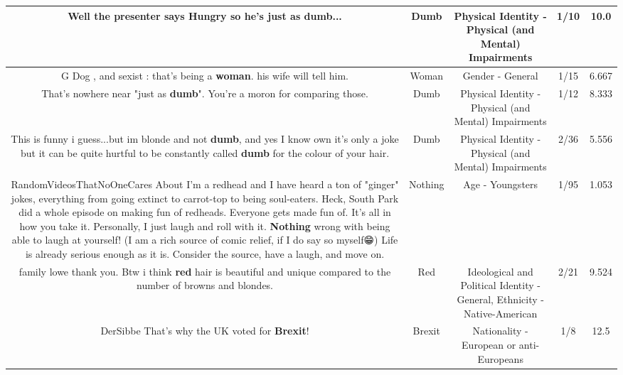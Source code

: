 \documentclass[11pt]{article}
\newlength\mylength
\begin{document}
\begin{center}
\begin{longtable}{|C{.65\mylength}|C{.30\mylength}|C{.12\mylength}|C{.12\mylength}|C{.12\mylength}|}
  \small Well the presenter says Hungry so he's just as \textbf{dumb}...\normalsize   & Dumb & Physical Identity - Physical (and Mental) Impairments & 1/10 & 10.0 \\  \hline
  \small G Dog ,  and sexist :  that's being a \textbf{woman}.  his wife will tell him.\normalsize   & Woman & Gender - General & 1/15 & 6.667 \\  \hline
  \small That's nowhere near "just as \textbf{dumb}". You're a moron for comparing those.\normalsize   & Dumb & Physical Identity - Physical (and Mental) Impairments & 1/12 & 8.333 \\  \hline
  \small This is funny i guess...but im blonde and not \textbf{dumb}, and yes I know own it's only a joke but it can be quite hurtful to be constantly called \textbf{dumb} for the colour of your hair.\normalsize   & Dumb & Physical Identity - Physical (and Mental) Impairments & 2/36 & 5.556 \\  \hline
  \small RandomVideosThatNoOneCares About I'm a redhead and I have heard a ton of "ginger" jokes, everything from going extinct to carrot-top to being soul-eaters. Heck, South Park did a whole episode on making fun of redheads. Everyone gets made fun of. It's all in how you take it. Personally, I just laugh and roll with it. \textbf{Nothing} wrong with being able to laugh at yourself! (I am a rich source of comic relief, if I do say so myself😁) Life is already serious enough as it is. Consider the source, have a laugh, and move on.\normalsize   & Nothing & Age - Youngsters & 1/95 & 1.053 \\  \hline
  \small family lowe thank you. Btw i think \textbf{r\textbf{ed}} hair is beautiful and unique compared to the number of browns and blondes.\normalsize   & Red &  Ideological and Political Identity - General, Ethnicity - Native-American & 2/21 & 9.524 \\  \hline
  \small DerSibbe That's why the UK voted for \textbf{Brexit}!\normalsize   & Brexit & Nationality - European or anti-Europeans & 1/8 & 12.5 \\  \hline

\end{longtable}
\end{center}
\end{document}
